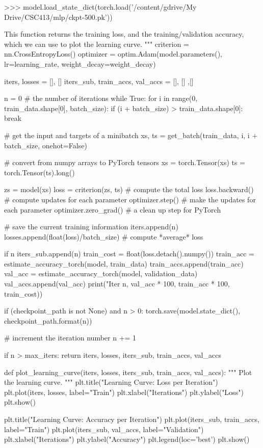 \documentclass[12pt]{article}
\begin{document}
\begin{python}
    >>> model.load_state_dict(torch.load('/content/gdrive/My Drive/CSC413/mlp/ckpt-500.pk'))

    This function returns the training loss, and the training/validation accuracy,
    which we can use to plot the learning curve.
    """
    criterion = nn.CrossEntropyLoss()
    optimizer = optim.Adam(model.parameters(),
                           lr=learning_rate,
                           weight_decay=weight_decay)

    iters, losses = [], []
    iters_sub, train_accs, val_accs  = [], [] ,[]

    n = 0 # the number of iterations
    while True:
        for i in range(0, train_data.shape[0], batch_size):
            if (i + batch_size) > train_data.shape[0]:
                break

            # get the input and targets of a minibatch
            xs, ts = get_batch(train_data, i, i + batch_size, onehot=False)

            # convert from numpy arrays to PyTorch tensors
            xs = torch.Tensor(xs)
            ts = torch.Tensor(ts).long()

            zs = model(xs)
            loss = criterion(zs, ts) # compute the total loss
            loss.backward()          # compute updates for each parameter
            optimizer.step()         # make the updates for each parameter
            optimizer.zero_grad()    # a clean up step for PyTorch

            # save the current training information
            iters.append(n)
            losses.append(float(loss)/batch_size)  # compute *average* loss

            if n %
                iters_sub.append(n)
                train_cost = float(loss.detach().numpy())
                train_acc = estimate_accuracy_torch(model, train_data)
                train_accs.append(train_acc)
                val_acc = estimate_accuracy_torch(model, validation_data)
                val_accs.append(val_acc)
                print("Iter %
                      n, val_acc * 100, train_acc * 100, train_cost))

                if (checkpoint_path is not None) and n > 0:
                    torch.save(model.state_dict(), checkpoint_path.format(n))

            # increment the iteration number
            n += 1

            if n > max_iters:
                return iters, losses, iters_sub, train_accs, val_accs


def plot_learning_curve(iters, losses, iters_sub, train_accs, val_accs):
    """
    Plot the learning curve.
    """
    plt.title("Learning Curve: Loss per Iteration")
    plt.plot(iters, losses, label="Train")
    plt.xlabel("Iterations")
    plt.ylabel("Loss")
    plt.show()

    plt.title("Learning Curve: Accuracy per Iteration")
    plt.plot(iters_sub, train_accs, label="Train")
    plt.plot(iters_sub, val_accs, label="Validation")
    plt.xlabel("Iterations")
    plt.ylabel("Accuracy")
    plt.legend(loc='best')
    plt.show()
\end{python}
\end{document}

